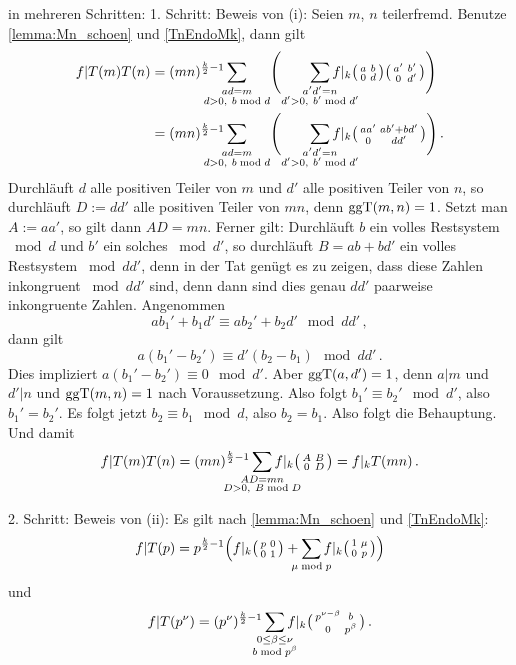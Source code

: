 \begin{bewe}
	in mehreren Schritten:
	1. Schritt: Beweis von (i):
	Seien $m$, $n$ teilerfremd.
	Benutze \autoref{lemma:Mn_schoen} und \autoref{TnEndoMk}, dann gilt
	\begin{align*}
	f|T(m)T(n)
	&= (mn)^{\frac{k}{2}-1} \smashoperator[l]{\sum_{\substack{ad=m \vphantom{d'} \\ d>0,\ \vphantom{b'}b\bmod d}}} \Biggl(\smashoperator[r]{\sum_{\substack{a'd' = n\\ d'>0,\ b' \bmod d'}}} f|_k \mymat ab0d \mymat{a'}{b'}{0}{d'} \Biggr) \\
	&= (mn)^{\frac{k}{2}-1} \smashoperator[l]{\sum_{\substack{ad=m \vphantom{d'} \\ d>0,\ \vphantom{b'}b\bmod d}}} \Biggl(\smashoperator[r]{\sum_{\substack{a'd' = n\\ d'>0,\ b' \bmod d'}}} f|_k \mymat{aa'}{ab'+bd'}{0}{dd'} \Biggr)
	\,.
	\end{align*}
	Durchläuft $d$ alle positiven Teiler von $m$ und $d'$ alle positiven Teiler von $n$, so durchläuft $D := dd'$ alle positiven Teiler von $mn$, denn $\operatorname{ggT}(m, n) = 1$.
	Setzt man $A := aa'$, so gilt dann $AD = mn$.
	Ferner gilt: Durchläuft $b$ ein volles Restsystem $\bmod d$ und $b'$ ein solches $\bmod d'$, so durchläuft $B = ab+bd'$ ein volles Restsystem $\bmod dd'$, denn in der Tat genügt es zu zeigen, dass diese Zahlen inkongruent $\bmod dd'$ sind, denn dann sind dies genau $dd'$ paarweise inkongruente Zahlen.
	Angenommen
	\[
	ab_1' + b_1d' \equiv ab_2' +b_2d' \mod dd'
	\,,
	\]
	dann gilt
	\[
	a(b_1' - b_2') \equiv d'(b_2 - b_1) \mod dd'
	\,.
	\]
	Dies impliziert $a(b_1'- b_2') \equiv 0 \mod d'$. Aber $\operatorname{ggT}(a, d') = 1$, denn $a|m$ und $d'|n$ und $\operatorname{ggT}(m, n) = 1$ nach Voraussetzung.
	Also folgt $b_1' \equiv b_2' \mod d'$, also $b_1' = b_2'$.
	Es folgt jetzt $b_2 \equiv b_1 \mod d$, also $b_2 = b_1$.
	Also folgt die Behauptung.
	Und damit
	\[
	f|T(m)T(n)
	= (mn)^{\frac{k}{2}-1} \smashoperator{\sum_{\substack{AD = mn\\ D > 0,\ B \bmod D}}} f|_k \mymat AB0D
	= f|_kT(mn)
	\,.
	\]
	
	
	2. Schritt: Beweis von (ii):
	Es gilt nach \autoref{lemma:Mn_schoen} und \autoref{TnEndoMk}:
	\[
	f|T(p) = p^{\frac{k}{2}-1} \Bigl(f|_k \mymat p001 + \smashoperator{\sum_{\mu \bmod p}} f|_k \mymat 1\mu0p \Bigr)
	\]
	und
	\[
	f|T(p^\nu) = (p^\nu)^{\frac{k}{2}-1} \smashoperator{\sum_{\substack{0 \leq \beta \leq \nu \\ b \bmod p^\beta}}} f|_k \mymat{p^{\nu-\beta}}b0{p^\beta}
	\,.
	\]
	

\end{bewe}
